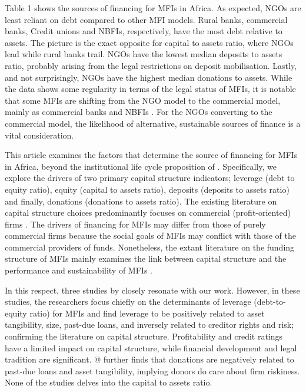\documentclass[a4paper, nobind]{templates/ociamthesis}
\begin{document}
Table 1 shows the sources of financing for MFIs in Africa. As expected, NGOs are least reliant on debt compared to other MFI models. Rural banks, commercial banks, Credit unions and NBFIs, respectively, have the most debt relative to assets. The picture is the exact opposite for capital to assets ratio, where NGOs lead while rural banks trail. NGOs have the lowest median deposits to assets ratio, probably arising from the legal restrictions on deposit mobilisation. Lastly, and not surprisingly, NGOs have the highest median donations to assets. While the data shows some regularity in terms of the legal status of MFIs, it is notable that some MFIs are shifting from the NGO model to the commercial model, mainly as commercial banks and NBFIs \autocite{sarma2011ngo,jia2016commercialization}. For the NGOs converting to the commercial model, the likelihood of alternative, sustainable sources of finance is a vital consideration.

This article examines the factors that determine the source of financing for MFIs in Africa, beyond the institutional life cycle proposition of \textcite{bayai2016financing}. Specifically, we explore the drivers of two primary capital structure indicators; leverage (debt to equity ratio), equity (capital to assets ratio), deposits (deposits to assets ratio) and finally, donations (donations to assets ratio). The existing literature on capital structure choices predominantly focuses on commercial (profit-oriented) firms \autocite{gropp2010determinants,liu2017optimal,matias2017there}. The drivers of financing for MFIs may differ from those of purely commercial firms because the social goals of MFIs may conflict with those of the commercial providers of funds. Nonetheless, the extant literature on the funding structure of MFIs mainly examines the link between capital structure and the performance and sustainability of MFIs \autocite{kyereboah2007determinants,khachatryan2017performance}.

In this respect, three studies by \autocite{kyereboah2007determinants,tchuigoua2014institutional,tchuigoua2015capital} closely resonate with our work. However, in these studies, the researchers focus chiefly on the determinants of leverage (debt-to-equity ratio) for MFIs and find leverage to be positively related to asset tangibility, size, past-due loans, and inversely related to creditor rights and risk; confirming the literature on capital structure. Profitability and credit ratings have a limited impact on capital structure, while financial development and legal tradition are significant. @\textcite{tchuigoua2014institutional} further finds that donations are negatively related to past-due loans and asset tangibility, implying donors do care about firm riskiness. None of the studies delves into the capital to assets ratio.
\end{document}
